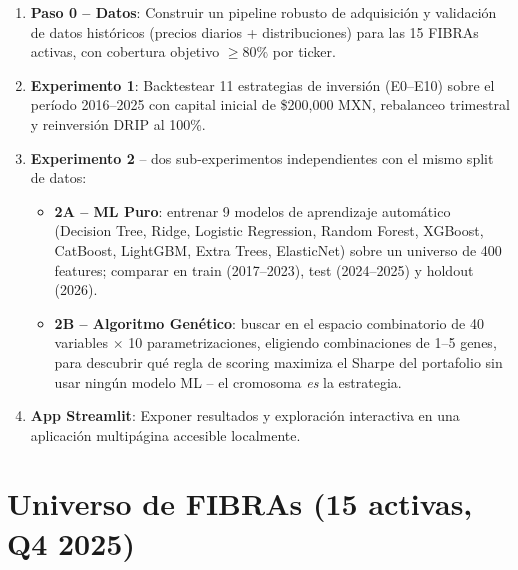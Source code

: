 \documentclass[12pt, a4paper]{article}
\begin{document}
\begin{enumerate}
  \item \textbf{Paso 0 -- Datos}: Construir un pipeline robusto de adquisici\'{o}n y validaci\'{o}n
        de datos hist\'{o}ricos (precios diarios + distribuciones) para las 15 FIBRAs activas,
        con cobertura objetivo $\geq 80\%$ por ticker.

  \item \textbf{Experimento 1}: Backtestear 11 estrategias de inversi\'{o}n (E0--E10) sobre el
        per\'{i}odo 2016--2025 con capital inicial de \$200{,}000 MXN, rebalanceo trimestral y
        reinversi\'{o}n DRIP al 100\%.

  \item \textbf{Experimento 2} -- dos sub-experimentos independientes con el mismo split de datos:
    \begin{itemize}
      \item \textbf{2A -- ML Puro}: entrenar 9 modelos de aprendizaje autom\'{a}tico (Decision Tree,
            Ridge, Logistic Regression, Random Forest, XGBoost, CatBoost, LightGBM, Extra Trees,
            ElasticNet) sobre un universo de 400 features; comparar en train (2017--2023),
            test (2024--2025) y holdout (2026).
      \item \textbf{2B -- Algoritmo Gen\'{e}tico}: buscar en el espacio combinatorio de
            40 variables $\times$ 10 parametrizaciones, eligiendo combinaciones de 1--5 genes,
            para descubrir qu\'{e} regla de scoring maximiza el Sharpe del portafolio sin usar
            ning\'{u}n modelo ML -- el cromosoma \emph{es} la estrategia.
    \end{itemize}

  \item \textbf{App Streamlit}: Exponer resultados y exploraci\'{o}n interactiva en una aplicaci\'{o}n
        multipágina accesible localmente.
\end{enumerate}

\section*{Universo de FIBRAs (15 activas, Q4 2025)}
\end{document}
